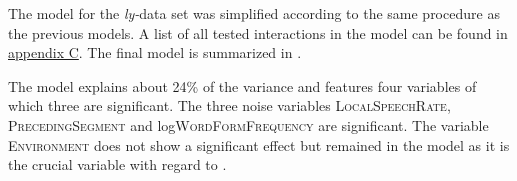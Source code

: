 The model for the \textit{ly-}data set was simplified according to the same procedure as the  previous models. A list of all tested interactions in the model can be found in \hyperref[Appendix C: Summaries of tested interactions in corpus study]{appendix C}. 
The final model is summarized in .


\begin{table}
	\caption{Summary of linear model for variables predicting the  duration of [l] in -suffixed words}
	\label{tbl: corpus summary model ly}
	
	
\end{table}





The model explains about 24\% of the variance and features four variables of which three are significant. The three noise variables \textsc{LocalSpeechRate}, \textsc{PrecedingSegment} and log\textsc{WordFormFrequency} are significant. 
The variable \textsc{Environment} does not show a significant effect but remained in the model as it is the crucial variable with regard to .



